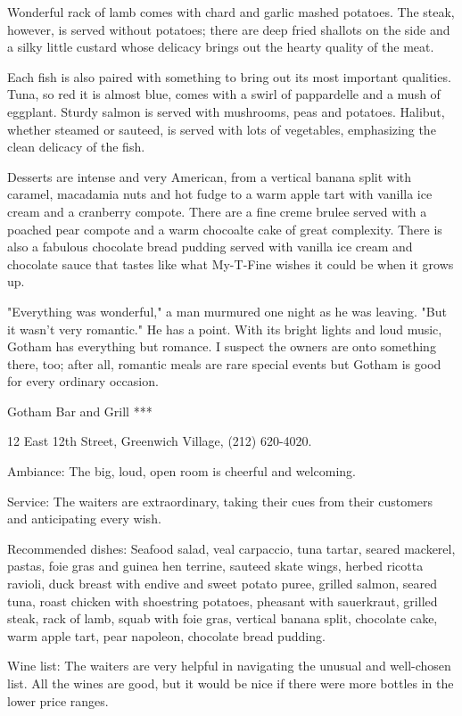 Wonderful rack of lamb comes with chard and garlic mashed potatoes. The
steak, however, is served without potatoes; there are deep fried
shallots on the side and a silky little custard whose delicacy brings
out the hearty quality of the meat.

Each fish is also paired with something to bring out its most important
qualities. Tuna, so red it is almost blue, comes with a swirl of
pappardelle and a mush of eggplant. Sturdy salmon is served with
mushrooms, peas and potatoes. Halibut, whether steamed or sauteed, is
served with lots of vegetables, emphasizing the clean delicacy of the
fish.

Desserts are intense and very American, from a vertical banana split
with caramel, macadamia nuts and hot fudge to a warm apple tart with
vanilla ice cream and a cranberry compote. There are a fine creme brulee
served with a poached pear compote and a warm chocoalte cake of great
complexity. There is also a fabulous chocolate bread pudding served with
vanilla ice cream and chocolate sauce that tastes like what My-T-Fine
wishes it could be when it grows up.

"Everything was wonderful," a man murmured one night as he was leaving.
"But it wasn't very romantic." He has a point. With its bright lights
and loud music, Gotham has everything but romance. I suspect the owners
are onto something there, too; after all, romantic meals are rare
special events but Gotham is good for every ordinary occasion.

Gotham Bar and Grill ***

12 East 12th Street, Greenwich Village, (212) 620-4020.

Ambiance: The big, loud, open room is cheerful and welcoming.

Service: The waiters are extraordinary, taking their cues from their
customers and anticipating every wish.

Recommended dishes: Seafood salad, veal carpaccio, tuna tartar, seared
mackerel, pastas, foie gras and guinea hen terrine, sauteed skate wings,
herbed ricotta ravioli, duck breast with endive and sweet potato puree,
grilled salmon, seared tuna, roast chicken with shoestring potatoes,
pheasant with sauerkraut, grilled steak, rack of lamb, squab with foie
gras, vertical banana split, chocolate cake, warm apple tart, pear
napoleon, chocolate bread pudding.

Wine list: The waiters are very helpful in navigating the unusual and
well-chosen list. All the wines are good, but it would be nice if there
were more bottles in the lower price ranges.

